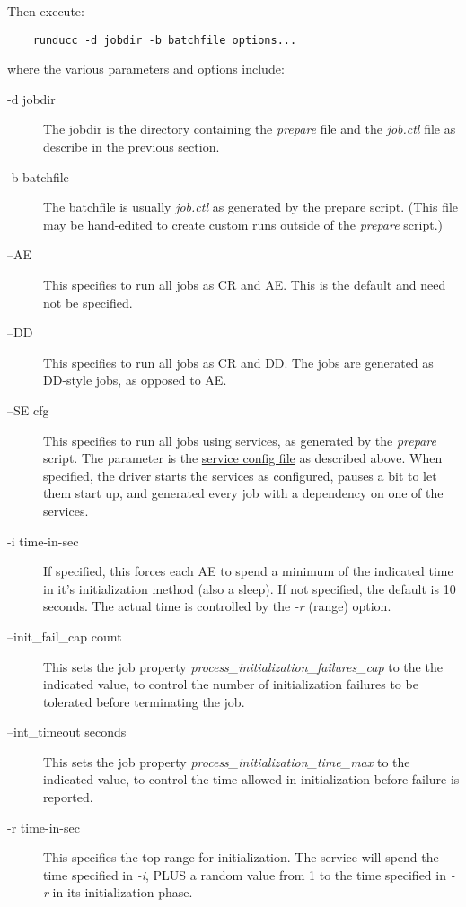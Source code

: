     Then execute:
\begin{verbatim}
    runducc -d jobdir -b batchfile options...
\end{verbatim}
    where the various parameters and options include:
    \begin{description}
      \item[-d jobdir] The jobdir is the directory containing the {\em prepare} file and the
        {\em job.ctl} file as describe in the previous section.
      \item[-b batchfile] The batchfile is usually {\em job.ctl} as generated by the
        prepare script.  (This file may be hand-edited to create custom runs outside
        of the {\em prepare} script.)
      \item[--AE] This specifies to run all jobs as CR and AE.  This is the default and
        need not be specified.
      \item[--DD] This specifies to run all jobs as CR and DD.  The jobs are generated as
        DD-style jobs, as opposed to AE.
      \item[--SE cfg] This specifies to run all jobs using services, as generated by the {\em
          prepare} script.  The parameter is the \hyperref[subsec:simulation.services]{service
          config file} as described above. When specified, the driver starts the services
        as configured, pauses a bit to let them start up, and generated every job with a
        dependency on one of the services.
      \item[-i time-in-sec] If specified, this forces each AE to spend a minimum of the indicated time
        in it's initialization method (also a sleep). If not specified, the default is
        10 seconds. The actual time is controlled by the {\em -r} (range) option.
      \item[--init\_fail\_cap count] This sets the job property {\em process\_initialization\_failures\_cap}
        to the the indicated value, to control the number of initialization failures to be tolerated
        before terminating the job.
      \item[--int\_timeout seconds] This sets the job property {\em process\_initialization\_time\_max}
        to the indicated value, to control the time allowed in initialization before failure is reported.
      \item[-r time-in-sec] This specifies the top range for initialization.  The service
        will spend the time specified in {\em -i}, PLUS a random value from 1 to
        the time specified in {\em -r} in its initialization phase.

\end{description}
